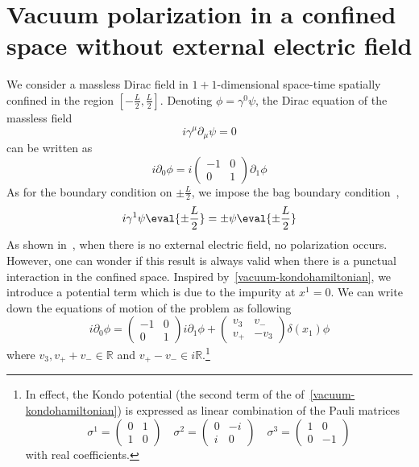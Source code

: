 \section{Vacuum polarization in a confined space without external electric field}\label{sect-nef}
We consider a massless Dirac field in $1+1$-dimensional space-time spatially confined in the region $[-\frac L 2 , \frac L 2 ]$.
Denoting $\phi = \gamma^0\psi$, the Dirac equation of the massless field
\begin{equation*}
i\gamma^\mu\partial_\mu \psi = 0
\end{equation*}
can be written as
\begin{equation*}
i\partial_0\phi = i \begin{pmatrix} -1 & 0 \\ 0 & 1 \end{pmatrix}\partial_1\phi
\end{equation*}
%
As for the boundary condition on $\pm \frac L 2$, we impose the bag boundary condition~\cite{Chodos1974}, \ie 
\begin{equation}\label{vacuum-bagboundcond}
i\gamma^1 \psi \eval{\pm \frac{L}{2}} = \pm \psi \eval{\pm \frac{L}{2}}
\end{equation}
%
As shown in~\cite{Zahn2015}, when there is no external electric field, no polarization occurs. 
However, one can wonder if this result is always valid when there is a punctual interaction in the confined space.
Inspired by~\cref{vacuum-kondohamiltonian}, we introduce a potential term which is due to the impurity at $x^1 = 0$.
We can write down the equations of motion of the problem as following
\begin{equation}\label{nef-Dirac}
i \partial_0 \phi = 
\begin{pmatrix} 
-1 & 0 \\
0 & 1 
\end{pmatrix} i \partial_1 \phi +
\begin{pmatrix}
v_3 & v_- \\
v_+ & -v_3
\end{pmatrix} \delta(x_1) \phi
\end{equation}
where $v_3, v_+ + v_- \in \mathbb{R}$ and $ v_+ - v_-\in i \mathbb{R}$.\footnote{
In effect, the Kondo potential (the second term of the \rhs of~\cref{vacuum-kondohamiltonian}) is expressed as linear combination of the Pauli matrices
\begin{equation*}
\sigma^1 = \begin{pmatrix} 0 & 1 \\ 1 & 0 \end{pmatrix} \quad
\sigma^2 = \begin{pmatrix} 0 & -i \\ i & 0 \end{pmatrix} \quad
\sigma^3 = \begin{pmatrix} 1 & 0 \\ 0 & -1 \end{pmatrix} 
\end{equation*}
with real coefficients.
}
